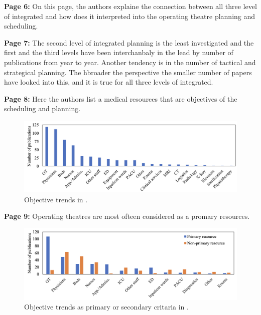     \textbf{Page 6:}
    On this page, the authors explaine the connection between all three level of integrated and how does it interpreted into the operating theatre planning and scheduling.

    \textbf{Page 7:}
    The second level of integrated planning is the least investigated and the first and the third levels have been interchanbaly in the lead by number of publications from year to year. Another tendency is in the number of tactical and strategical planning. The hbroader the perspective the smaller number of papers have looked into this, and it is true for all three levels of integrated.
    
    \textbf{Page 8:}
    Here the authors list a medical resources that are objectives of the scheduling and planning.
    \begin{figure}[H]
        \centering
        \includegraphics[width=1\textwidth]{figures/SR0010NL23/fig2.png}
        \caption{Objective trends in \cite{x338}.}
        \label{fig2:SR0010NL23}
    \end{figure}
    
    \textbf{Page 9:}
    Operating theatres are most ofteen considered as a promary resources.
    \begin{figure}[H]
        \centering
        \includegraphics[width=1\textwidth]{figures/SR0010NL23/fig3.png}
        \caption{Objective trends as primary or secondary critaria in \cite{x338}.}
        \label{fig3:SR0010NL23}
    \end{figure}
    
